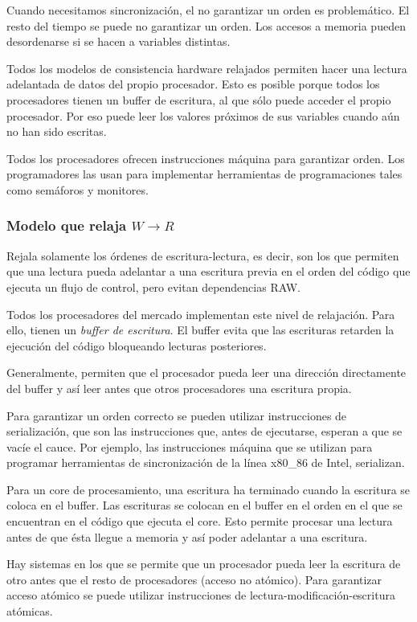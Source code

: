 \documentclass[10pt,a4paper,spanish]{report}
\begin{document}
Cuando necesitamos sincronización, el no garantizar un orden es problemático. El resto del tiempo se puede no garantizar un orden. Los accesos a memoria pueden desordenarse si se hacen a variables distintas.

Todos los modelos de consistencia hardware relajados permiten hacer una lectura adelantada de datos del propio procesador. Esto es posible porque todos los procesadores tienen un buffer de escritura, al que sólo puede acceder el propio procesador. Por eso puede leer los valores próximos de sus variables cuando aún no han sido escritas.

Todos los procesadores ofrecen instrucciones máquina para garantizar orden. Los programadores las usan para implementar herramientas de programaciones tales como semáforos y monitores.

\textcolor[rgb]{0.2,0.4,0.8}{\subsubsection{Modelo que relaja $W \rightarrow R$}}
Rejala solamente los órdenes de escritura-lectura, es decir, son los que permiten que una lectura pueda adelantar a una escritura previa en el orden del código que ejecuta un flujo de control, pero evitan dependencias RAW. 

Todos los procesadores del mercado implementan este nivel de relajación. Para ello, tienen un \textcolor[rgb]{0.2,0.4,0.8}{\textit{buffer de escritura}}. El buffer evita que las escrituras retarden la ejecución del código bloqueando lecturas posteriores.

Generalmente, permiten que el procesador pueda leer una dirección directamente del buffer y así leer antes que otros procesadores una escritura propia.

Para garantizar un orden correcto se pueden utilizar instrucciones de serialización, que son las instrucciones que, antes de ejecutarse, esperan a que se vacíe el cauce. Por ejemplo, las instrucciones máquina que se utilizan para programar herramientas de sincronización de la línea x80\_86 de Intel, serializan.

Para un core de procesamiento, una escritura ha terminado cuando la escritura se coloca en el buffer. Las escrituras se colocan en el buffer en el orden en el que se encuentran en el código que ejecuta el core. Esto permite procesar una lectura antes de que ésta llegue a memoria y así poder adelantar a una escritura.

Hay sistemas en los que se permite que un procesador pueda leer la escritura de otro antes que el resto de procesadores (acceso no atómico). Para garantizar acceso atómico se puede utilizar instrucciones de lectura-modificación-escritura atómicas.
\end{document}
